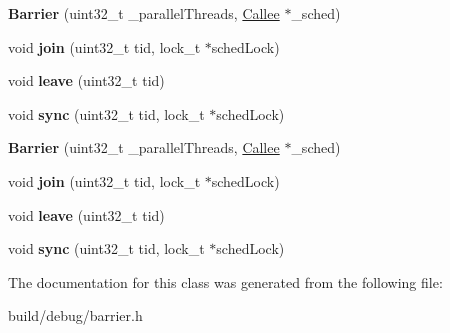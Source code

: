 \begin{DoxyCompactItemize}
\item 
\hypertarget{classBarrier_afba5acbf7c4c59a188b7095427d6bca8}{{\bfseries Barrier} (uint32\-\_\-t \-\_\-parallel\-Threads, \hyperlink{classCallee}{Callee} $\ast$\-\_\-sched)}\label{classBarrier_afba5acbf7c4c59a188b7095427d6bca8}

\item 
\hypertarget{classBarrier_acf3161220f8103268e839886aa5abd7e}{void {\bfseries join} (uint32\-\_\-t tid, lock\-\_\-t $\ast$sched\-Lock)}\label{classBarrier_acf3161220f8103268e839886aa5abd7e}

\item 
\hypertarget{classBarrier_a9f8323ec211fee7ab01ecd5a09915b15}{void {\bfseries leave} (uint32\-\_\-t tid)}\label{classBarrier_a9f8323ec211fee7ab01ecd5a09915b15}

\item 
\hypertarget{classBarrier_ade91fab85fc326b8484e9aa0e24c33c7}{void {\bfseries sync} (uint32\-\_\-t tid, lock\-\_\-t $\ast$sched\-Lock)}\label{classBarrier_ade91fab85fc326b8484e9aa0e24c33c7}

\item 
\hypertarget{classBarrier_afba5acbf7c4c59a188b7095427d6bca8}{{\bfseries Barrier} (uint32\-\_\-t \-\_\-parallel\-Threads, \hyperlink{classCallee}{Callee} $\ast$\-\_\-sched)}\label{classBarrier_afba5acbf7c4c59a188b7095427d6bca8}

\item 
\hypertarget{classBarrier_acf3161220f8103268e839886aa5abd7e}{void {\bfseries join} (uint32\-\_\-t tid, lock\-\_\-t $\ast$sched\-Lock)}\label{classBarrier_acf3161220f8103268e839886aa5abd7e}

\item 
\hypertarget{classBarrier_a9f8323ec211fee7ab01ecd5a09915b15}{void {\bfseries leave} (uint32\-\_\-t tid)}\label{classBarrier_a9f8323ec211fee7ab01ecd5a09915b15}

\item 
\hypertarget{classBarrier_ade91fab85fc326b8484e9aa0e24c33c7}{void {\bfseries sync} (uint32\-\_\-t tid, lock\-\_\-t $\ast$sched\-Lock)}\label{classBarrier_ade91fab85fc326b8484e9aa0e24c33c7}

\end{DoxyCompactItemize}


The documentation for this class was generated from the following file\-:\begin{DoxyCompactItemize}
\item 
build/debug/barrier.\-h\end{DoxyCompactItemize}
